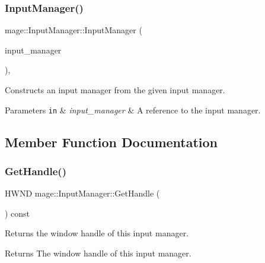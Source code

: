 \subsubsection{\texorpdfstring{Input\+Manager()}{InputManager()}\hspace{0.1cm}{\footnotesize\ttfamily [2/2]}}
{\footnotesize\ttfamily mage\+::\+Input\+Manager\+::\+Input\+Manager (\begin{DoxyParamCaption}\item[{const \hyperlink{classmage_1_1_input_manager}{Input\+Manager} \&}]{input\+\_\+manager }\end{DoxyParamCaption})\hspace{0.3cm}{\ttfamily [private]}, {\ttfamily [delete]}}

Constructs an input manager from the given input manager.


\begin{DoxyParams}[1]{Parameters}
\mbox{\tt in}  & {\em input\+\_\+manager} & A reference to the input manager. \\
\hline
\end{DoxyParams}


\subsection{Member Function Documentation}
\hypertarget{classmage_1_1_input_manager_a25d5f7f06b1c9d252d44d476f04b5ce3}{}\label{classmage_1_1_input_manager_a25d5f7f06b1c9d252d44d476f04b5ce3} 
\subsubsection{\texorpdfstring{Get\+Handle()}{GetHandle()}}
{\footnotesize\ttfamily H\+W\+ND mage\+::\+Input\+Manager\+::\+Get\+Handle (\begin{DoxyParamCaption}{ }\end{DoxyParamCaption}) const}

Returns the window handle of this input manager.

\begin{DoxyReturn}{Returns}
The window handle of this input manager. 
\end{DoxyReturn}
\hypertarget{classmage_1_1_input_manager_a1702868136ae35014f27357b5b0f5ce8}{}\label{classmage_1_1_input_manager_a1702868136ae35014f27357b5b0f5ce8} 
